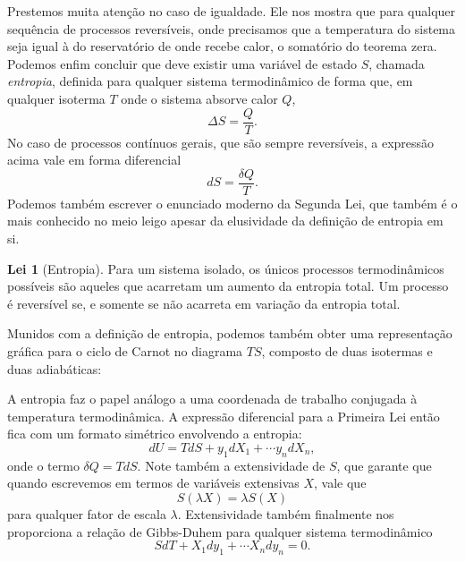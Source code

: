 \documentclass[a4paper, 12pt]{article}
\theoremstyle{definition}
\theoremstyle{definition}
\newtheorem{law}{Lei}
\begin{document}
Prestemos muita atenção no caso de igualdade. Ele nos mostra que para qualquer sequência de processos
reversíveis, onde precisamos que a temperatura do sistema seja igual à do reservatório de onde recebe
calor, o somatório do teorema zera. Podemos enfim concluir que deve existir uma variável de estado $S$,
chamada \textit{entropia}, definida para qualquer sistema termodinâmico de forma que, em qualquer 
isoterma $T$ onde o sistema absorve calor $Q$,
$$\Delta S=\frac{Q}{T}.$$
No caso de processos contínuos gerais, que são sempre reversíveis, a expressão acima vale em forma 
diferencial
$$dS=\frac{\delta Q}{T}.$$
Podemos também escrever o enunciado moderno da Segunda Lei, que também é o mais conhecido no meio leigo apesar
da elusividade da definição de entropia em si.
\setcounter{law}{1}
\begin{law}[Entropia]
    Para um sistema isolado, os únicos processos termodinâmicos possíveis são aqueles que acarretam
    um aumento da entropia total. Um processo é reversível se, e somente se não acarreta em variação
    da entropia total.
\end{law}

Munidos com a definição de entropia, podemos também obter uma representação gráfica para o ciclo de
Carnot no diagrama $TS$, composto de duas isotermas e duas adiabáticas:

\begin{figure}[H]
    \centering
\end{figure}

A entropia faz o papel análogo a uma coordenada de trabalho conjugada à temperatura termodinâmica. A
expressão diferencial para a Primeira Lei então fica com um formato simétrico envolvendo a entropia:
$$dU=TdS+y_1dX_1+\cdots y_ndX_n,$$
onde o termo $\delta Q=TdS$. Note também a extensividade de $S$, que garante que quando escrevemos
em termos de variáveis extensivas $X$, vale que
$$S(\lambda X)=\lambda S(X)$$
para qualquer fator de escala $\lambda$. Extensividade também finalmente nos proporciona a relação de 
Gibbs-Duhem para qualquer sistema termodinâmico
$$SdT+X_1dy_1+\cdots X_ndy_n=0.$$
\end{document}

